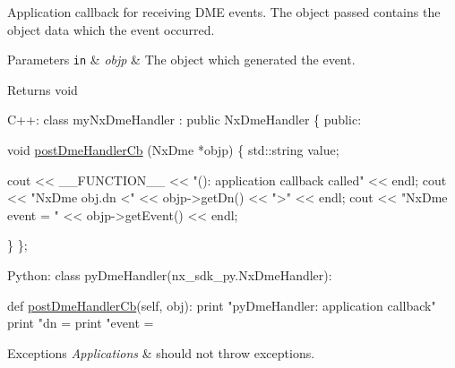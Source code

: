Application callback for receiving D\+ME events. The object passed contains the object data which the event occurred.


\begin{DoxyParams}[1]{Parameters}
\mbox{\tt in}  & {\em objp} & The object which generated the event. \\
\hline
\end{DoxyParams}
\begin{DoxyReturn}{Returns}
void 
\begin{DoxyCode}
C++:
  \textcolor{keyword}{class }myNxDmeHandler : \textcolor{keyword}{public} NxDmeHandler \{
  \textcolor{keyword}{public}:

    \textcolor{keywordtype}{void} \mbox{\hyperlink{classnxos_1_1_nx_dme_mgr_handler_a26838519d4f1d17c2036feb036a0e892}{postDmeHandlerCb}} (NxDme *objp)
    \{
      std::string value;

      cout << \_\_FUNCTION\_\_ << \textcolor{stringliteral}{"(): application callback called"} << endl;
      cout << \textcolor{stringliteral}{"NxDme obj.dn <"} << objp->getDn() << \textcolor{stringliteral}{">"} << endl;
      cout << \textcolor{stringliteral}{"NxDme event = "} << objp->getEvent() << endl;

    \}
  \};


Python:
  \textcolor{keyword}{class }pyDmeHandler(nx\_sdk\_py.NxDmeHandler):

     def \mbox{\hyperlink{classnxos_1_1_nx_dme_mgr_handler_a26838519d4f1d17c2036feb036a0e892}{postDmeHandlerCb}}(self, obj):
         print "pyDmeHandler: application callback"
         print "dn = %
         print "event = %
\end{DoxyCode}

\end{DoxyReturn}

\begin{DoxyExceptions}{Exceptions}
{\em Applications} & should not throw exceptions. \\
\hline
\end{DoxyExceptions}
\mbox{\label{classnxos_1_1_nx_dme_mgr_handler_a785b584b966bb8212c22e506ff568236}} 
